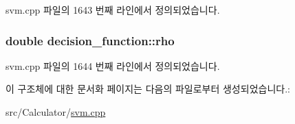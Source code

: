svm.\+cpp 파일의 1643 번째 라인에서 정의되었습니다.

\hypertarget{structdecision__function_ae2aeeaa508803351b22d4454b81cb375}{
\subsubsection[{rho}]{\setlength{\rightskip}{0pt plus 5cm}double decision\+\_\+function\+::rho}}\label{structdecision__function_ae2aeeaa508803351b22d4454b81cb375}


svm.\+cpp 파일의 1644 번째 라인에서 정의되었습니다.



이 구조체에 대한 문서화 페이지는 다음의 파일로부터 생성되었습니다.\+:\begin{DoxyCompactItemize}
\item 
src/\+Calculator/\hyperlink{svm_8cpp}{svm.\+cpp}\end{DoxyCompactItemize}
